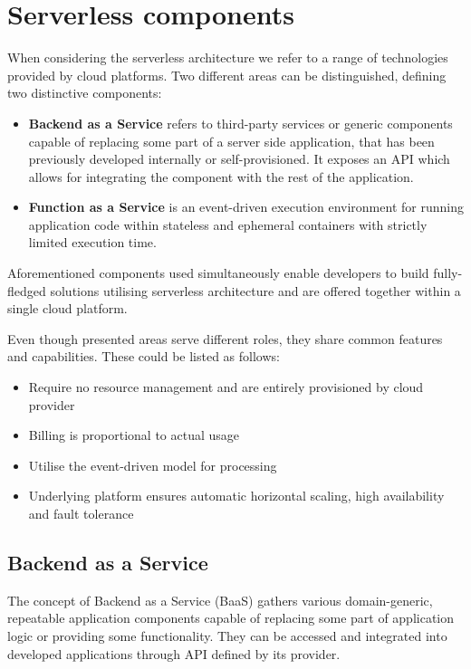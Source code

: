 \section{Serverless components}

When considering the serverless architecture we refer to a range of technologies provided by cloud platforms. Two different areas can be distinguished, defining two distinctive components:

\begin{itemize}
    \item \textbf{Backend as a Service} refers to third-party services or generic components capable of replacing some part of a server side application, that has been previously developed internally or self-provisioned. It exposes an API which allows for integrating the component with the rest of the application.
    \item \textbf{Function as a Service} is an event-driven execution environment for running application code within stateless and ephemeral containers with strictly limited execution time.
\end{itemize}

Aforementioned components used simultaneously enable developers to build fully-fledged solutions utilising serverless architecture and are offered together within a single cloud platform.

Even though presented areas serve different roles, they share common features and capabilities. These could be listed as follows:

\begin{itemize}
    \item Require no resource management and are entirely provisioned by cloud provider
    \item Billing is proportional to actual usage
    \item Utilise the event-driven model for processing
    \item Underlying platform ensures automatic horizontal scaling, high availability and fault tolerance
\end{itemize}

\subsection{Backend as a Service}

The concept of Backend as a Service (BaaS) gathers various domain-generic, repeatable application components capable of replacing some part of application logic or providing some functionality. They can be accessed and integrated into developed applications through API defined by its provider.

